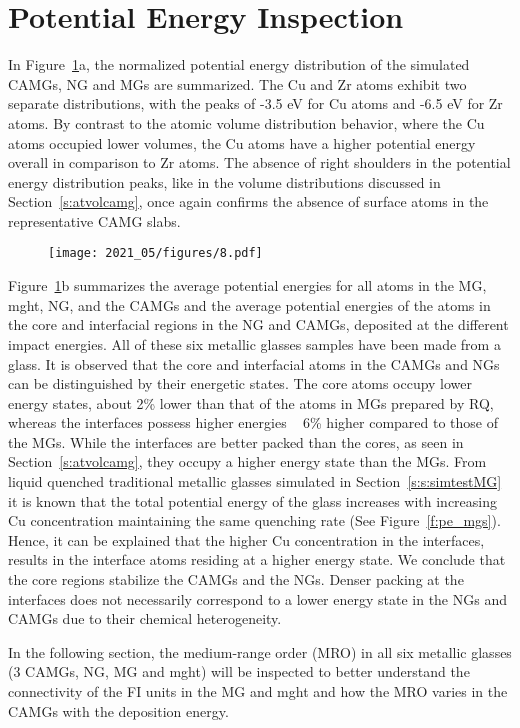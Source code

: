 \section{Potential Energy Inspection} \label{s:camg-pe}

\begin{selfcite}
In Figure~\ref{f:pe_camg}a, the normalized potential energy distribution of the simulated CAMGs, NG and MGs are summarized. The Cu and Zr atoms exhibit two separate distributions, with the peaks of -3.5 eV for Cu atoms and -6.5 eV for Zr atoms. By contrast to the atomic volume distribution behavior, where the Cu atoms occupied lower volumes, the Cu atoms have a higher potential energy overall in comparison to Zr atoms. The absence of right shoulders in the potential energy distribution peaks, like in the volume distributions discussed in Section~\ref{s:atvolcamg}, once again confirms the absence of surface atoms in the representative CAMG slabs. \par

\begin{figure}[!h] \centering
	\texttt{[image: 2021\_05/figures/8.pdf]}
	\label{f:pe_camg}
\end{figure}


Figure~\ref{f:pe_camg}b summarizes the average potential energies for all atoms in the MG, \gls{mght}, NG, and the CAMGs and the average potential energies of the atoms in the core and interfacial regions in the NG and CAMGs, deposited at the different impact energies. All of these six metallic glasses samples have been made from a  \cz glass. It is observed that the core and interfacial atoms in the CAMGs and NGs can be distinguished by their energetic states. The core atoms occupy lower energy states, about 2\% lower than that of the atoms in MGs prepared by RQ, whereas the interfaces possess higher energies ~ 6\% higher compared to those of the MGs. While the interfaces are better packed than the cores, as seen in Section~\ref{s:atvolcamg}, they occupy a higher energy state than the MGs. From liquid quenched traditional metallic glasses simulated in Section~\ref{s:s:simtestMG} it is known that the total potential energy of the glass increases with increasing Cu concentration maintaining the same quenching rate (See Figure~\ref{f:pe_mgs}). Hence, it can be explained that the higher Cu concentration in the interfaces, results in the interface atoms residing at a higher energy state. We conclude that the core regions stabilize the CAMGs and the NGs. Denser packing at the interfaces does not necessarily correspond to a lower energy state in the NGs and CAMGs due to their chemical heterogeneity. \par

In the following section, the medium-range order (MRO) in all six metallic glasses (3 CAMGs, NG, MG and \gls{mght}) will be inspected to better understand the connectivity of the FI units in the MG and \gls{mght} and how the MRO varies in the CAMGs with the deposition energy.
\end{selfcite}